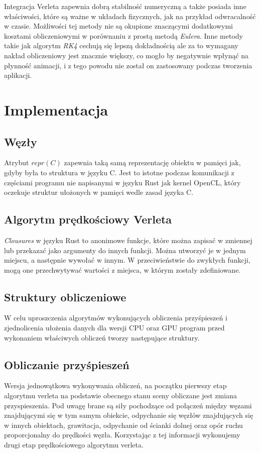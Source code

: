 \documentclass[12pt, letterpaper]{report}
\begin{document}
    Integracja Verleta zapewnia dobrą stabilność numeryczną a także posiada inne właściwości, które 
    są ważne w układach fizycznych, jak na przykład odwracalność w czasie. Możliwości tej metody nie są 
    okupione znaczącymi dodatkowymi kosztami obliczeniowymi w porównaniu z prostą metodą \emph{Eulera}. 
    Inne metody takie jak algorytm \emph{RK4} cechują się lepszą dokładnością ale za 
    to wymagany nakład obliczeniowy jest znacznie większy, co mogło by negatywnie wpłynąć na płynność animacji,
    i z tego powodu nie został on zastosowany podczas tworzenia aplikacji.

\chapter{Implementacja}
    \section{Węzły}
    
    Atrybut $repr(C)$ zapewnia taką samą reprezentację obiektu w pamięci jak, gdyby była to
    struktura w języku C. Jest to istotne podczas komunikacji z częściami programu nie napisanymi
    w języku Rust jak kernel OpenCL, który oczekuje struktur ułożonych w pamięci wedle zasad 
    języka C.

    \section{Algorytm prędkościowy Verleta}
    

    \emph{Clousures} w języku Rust to anonimowe funkcje, które można zapisać w zmiennej lub przekazać 
    jako argumenty do innych funkcji. Można utworzyć je w jednym miejscu, a następnie wywołać w innym.
    W przeciwieństwie do zwykłych funkcji, mogą one przechwytywać wartości z miejsca, w 
    którym zostały zdefiniowane.

    \section{Struktury obliczeniowe}
    W celu uproszczenia algorytmów wykonujących obliczenia przyśpieszeń i zjednolicenia 
    ułożenia danych dla wersji CPU oraz GPU program przed wykonaniem właściwych obliczeń
    tworzy następujące struktury.

    \section{Obliczanie przyśpieszeń}
    
    Wersja jednowątkowa wykonywania obliczeń, na początku pierwszy etap algorytmu verleta na podstawie 
    obecnego stanu sceny obliczane jest zmiana przyspieszenia. 
    Pod uwagę brane są siły pochodzące od połączeń między 
    węzami znajdującymi się w tym samym obiekcie, odpychanie się węzłów znajdujących się w innych obiektach, 
    grawitacja, odpychanie od ścianki dolnej oraz opór ruchu proporcjonalny do prędkości węzła.
    Korzystając z tej informacji wykonujemy drugi etap prędkościowego algorytmu verleta.
\end{document}
